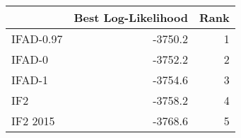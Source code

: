 \begin{tabular}{lrr}
\toprule
 & Best Log-Likelihood & Rank \\
\midrule
IFAD-0.97 & -3750.2 & 1 \\
IFAD-0 & -3752.2 & 2 \\
IFAD-1 & -3754.6 & 3 \\
IF2 & -3758.2 & 4 \\
IF2 2015 & -3768.6 & 5 \\
\bottomrule
\end{tabular}
